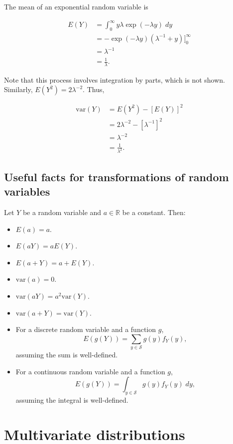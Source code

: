 \documentclass[
]{book}
\providecommand{\tightlist}{%
  \setlength{\itemsep}{0pt}\setlength{\parskip}{0pt}}
\theoremstyle{definition}
\theoremstyle{definition}
\theoremstyle{definition}
\theoremstyle{definition}
\theoremstyle{remark}
\begin{document}
The mean of an exponential random variable is

\[
\begin{aligned}
E(Y) &= \int_{0}^{\infty} y\lambda \exp(-\lambda y)\;dy \\
&= -\exp(-\lambda y)(\lambda^{-1}+y)\biggr]^{\infty}_{0}\\
&=\lambda^{-1} \\
&=\frac{1}{\lambda}.
\end{aligned}
\]

Note that this process involves integration by parts, which is not shown. Similarly, \(E(Y^2)=2\lambda^{-2}\). Thus,

\[
\begin{aligned}
\mathrm{var}(Y)&= E(Y^2)-[E(Y)]^2\\
&=2\lambda^{-2}-[\lambda^{-1}]^2\\
&=\lambda^{-2}\\
&=\frac{1}{\lambda^{2}}.
\end{aligned}
\]

\hypertarget{useful-facts-for-transformations-of-random-variables}{%
\subsection{Useful facts for transformations of random variables}\label{useful-facts-for-transformations-of-random-variables}}

Let \(Y\) be a random variable and \(a\in\mathbb{R}\) be a constant. Then:

\begin{itemize}
\tightlist
\item
  \(E(a) = a\).
\item
  \(E(aY) = a E(Y)\).
\item
  \(E(a + Y) = a + E(Y)\).
\item
  \(\mathrm{var}(a) = 0\).
\item
  \(\mathrm{var}(aY) = a^2 \mathrm{var}(Y)\).
\item
  \(\mathrm{var}(a + Y) = \mathrm{var}(Y)\).
\item
  For a discrete random variable and a function \(g\), \[E(g(Y))=\sum_{y\in\mathcal{S}}g(y)f_Y(y),\]
  assuming the sum is well-defined.
\item
  For a continuous random variable and a function \(g\), \[E(g(Y))=\int_{y\in\mathcal{S}}g(y)f_Y(y)\;dy,\]
  assuming the integral is well-defined.
\end{itemize}

\hypertarget{multivariate-distributions}{%
\section{Multivariate distributions}\label{multivariate-distributions}}
\end{document}
